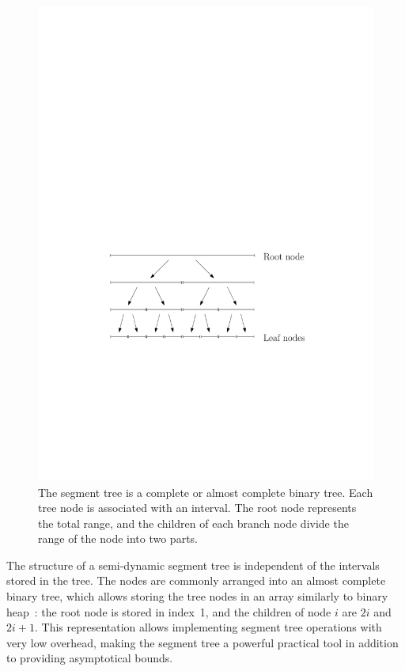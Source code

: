 \documentclass[english,gradu]{tktltiki2018}
\begin{document}
\begin{figure}\centering
	\includegraphics[scale=0.7,page=1]{fig/segtree}
	\caption{The segment tree is a complete or almost complete binary tree.
	Each tree node is associated with an interval.
	The root node represents the total range, and the children of each branch node divide the range of the node into two parts.}\label{fig:segtree}
\end{figure}

The structure of a semi-dynamic segment tree is independent of the intervals stored in the tree.
The nodes are commonly arranged into an almost complete binary tree, which allows storing the tree nodes in an array similarly to binary heap~\cite{kkkk}:
the root node is stored in index~1, and the children of node $i$ are $2i$ and $2i+1$.
This representation allows implementing segment tree operations with very low overhead, making the segment tree a powerful practical tool in addition to providing asymptotical bounds.
\end{document}
